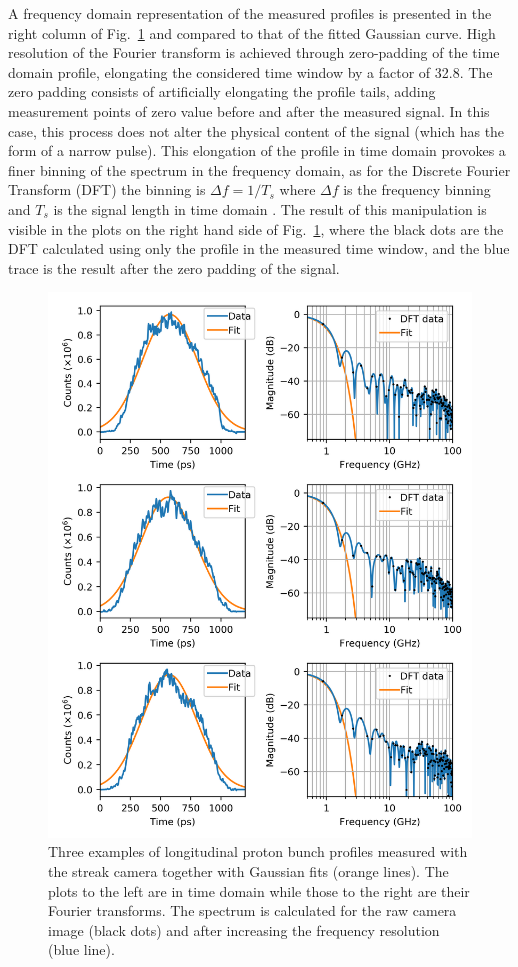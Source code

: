 A frequency domain representation of the measured profiles is presented in the right column of Fig.~\ref{fig:streak_profiles} and compared to that of the fitted Gaussian curve. High resolution of the Fourier transform is achieved through zero-padding of the time domain profile, elongating the considered time window by a factor of 32.8. The zero padding consists of artificially elongating the profile tails, adding measurement points of zero value before and after the measured signal. In this case, this process does not alter the physical content of the signal (which has the form of a narrow pulse). This elongation of the profile in time domain provokes a finer binning of the spectrum in the frequency domain, as for the Discrete Fourier Transform (DFT) the binning is
$ \Delta f = 1 / T_s$
where $\Delta f$ is the frequency binning and $T_s$ is the signal length in time domain \cite{DSP-guide}. The result of this manipulation is visible in the plots on the right hand side of Fig.~\ref{fig:streak_profiles}, where the black dots are the DFT calculated using only the profile in the measured time window, and the blue trace is the result after the zero padding of the signal. 


\begin{figure}[!t]
\centering
\includegraphics[scale=1, keepaspectratio]{pictures/profiles_fft}
\caption{Three examples of longitudinal proton bunch profiles measured with the streak camera together with Gaussian fits (orange lines). The plots to the left are in time domain while those to the right are their Fourier transforms. The spectrum is calculated for the raw camera image (black dots) and after increasing the frequency resolution (blue line).}
\label{fig:streak_profiles}
\end{figure}



